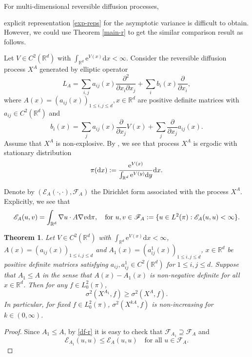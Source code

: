 \documentclass[12pt,reqno]{article}
\newtheorem{thm}{Theorem}[section]
\theoremstyle{definition}
\theoremstyle{remark}
\theoremstyle{example}
\numberwithin{equation}{section}
\newcommand{\scr}[1]{\mathscr #1}
\def\d{\mathrm{d}}
\def\e{\scr E}
\def\bR{\mathbb R}
\def\d{\rm d}
\def\lb{\label}
\def\d{{\mbox{\rm d}}}
\begin{document}
For multi-dimensional reversible diffusion processes, {explicit representation \eqref{exp-reps} for the asymptotic variance is difficult to obtain. However, we could use Theorem \ref{main-r} to get the similar comparison result as follows.


Let $V\in C^2(\bR^d)$ with $\int_{\bR^d} \mathrm{e}^{V(x)}\mathrm{d} x<\infty$. Consider the reversible diffusion process $X^{A}$ generated by  elliptic operator
$$L_{A}=\sum_{i, j} a_{i j}(x) \frac{\partial^{2}}{\partial x_{i} \partial x_{j}}+\sum_{i} b_{i}(x) \frac{\partial}{\partial x_{i}},$$
where $A(x)=\left(a_{i j}(x)\right)_{1\leq i,j\leq d},x\in\bR^d$ are positive definite matrices with $a_{i j}\in  C^{2}\left(\mathbb{R}^{d}\right)$ and
$$
b_{i}(x)=\sum_{j} a_{i j}(x) \frac{\partial}{\partial x_{j}} V(x)+\sum_{j} \frac{\partial}{\partial x_{j}} a_{i j}(x).
$$
Assume that $X^A$ is non-explosive. By \cite[Theorem 4.2.1]{DZ96}, we see that process $X^{A}$ is ergodic with stationary distribution
$$\pi(\d x):=\frac{\mathrm{e}^{V(x)}}{\int_{\bR^d} \mathrm{e}^{V(y)}\mathrm{d} y}\mathrm{d} x.$$


Denote by $(\e_{A}(\cdot,\cdot),\scr{F}_A)$  the Dirichlet form associated with the process $X^{A}$. Explicitly, we see that
\begin{equation}\lb{df-r}
\e_{A}(u,v)=\int_{\bR^d}\nabla u\cdot A\nabla v\d \pi,\quad \text{for}\ u,v\in \scr{F}_A:=\{u\in L^2(\pi): \e_A(u,u)<\infty\}.
\end{equation}

\begin{thm}\lb{compa-r}
Let $V\in C^2(\bR^d)$ with $\int_{\bR^d} \mathrm{e}^{V(x)}\mathrm{d} x<\infty$, $A(x)=(a_{ij}(x))_{1\leq i,j\leq d}$ and $A_1(x)=(a^1_{ij}(x))_{1\leq i,j\leq d}$, $x\in \bR^d$ be positive definite matrices satisfying $a_{ij}, a^1_{ij}\in C^2(\bR^d)$ for $1\leq i,j\leq d$. Suppose that $A_1\leq A$ in the sense that $A(x)-A_1(x)$ is non-negative definite for all $x\in\bR^d$.
Then for any $f\in L^2_0(\pi)$,
\begin{equation}\lb{A12}
\sigma^2(X^{A_1},f)\geq \sigma^2(X^{A},f).
\end{equation}
 In particular, for fixed $f\in L^2_0(\pi)$, $\sigma^2(X^{kA},f)$ is non-increasing for $k\in(0,\infty)$.
\end{thm}
\begin{proof}
Since $A_1\leq A$, by \eqref{df-r} it is easy to check that $\scr{F}_{A_1}\supseteq \scr{F}_{A}$ and
$$
\e_{A_1}(u,u)\leq \e_{A}(u,u)\quad \text{for all }u\in \scr{F}_{A}.
$$


\end{proof}}
\end{document}
